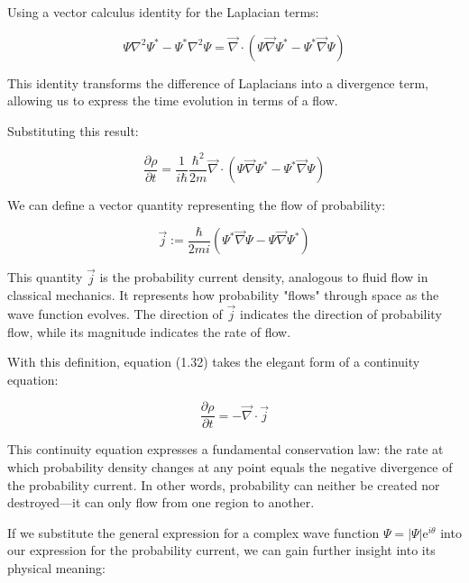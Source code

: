\documentclass[10pt]{article}
\begin{document}
Using a vector calculus identity for the Laplacian terms:

\begin{equation*}
\Psi \nabla^{2} \Psi^{*}-\Psi^{*} \nabla^{2} \Psi=\vec{\nabla} \cdot\left(\Psi \vec{\nabla} \Psi^{*}-\Psi^{*} \vec{\nabla} \Psi\right) \tag{1.31}
\end{equation*}

This identity transforms the difference of Laplacians into a divergence term, allowing us to express the time evolution in terms of a flow.

Substituting this result:

\begin{equation*}
\frac{\partial \rho}{\partial t}=\frac{1}{i\hbar}\frac{\hbar^{2}}{2 m} \vec{\nabla} \cdot\left(\Psi \vec{\nabla} \Psi^{*}-\Psi^{*} \vec{\nabla} \Psi\right) \tag{1.32}
\end{equation*}

We can define a vector quantity representing the flow of probability:

\begin{equation*}
\vec{j}:=\frac{\hbar}{2 m i}\left(\Psi^{*} \vec{\nabla} \Psi-\Psi \vec{\nabla} \Psi^{*}\right) \tag{1.33}
\end{equation*}

This quantity $\vec{j}$ is the probability current density, analogous to fluid flow in classical mechanics. It represents how probability "flows" through space as the wave function evolves. The direction of $\vec{j}$ indicates the direction of probability flow, while its magnitude indicates the rate of flow.

With this definition, equation (1.32) takes the elegant form of a continuity equation:

\begin{equation*}
\frac{\partial \rho}{\partial t}=-\vec{\nabla} \cdot \vec{j} \tag{1.34}
\end{equation*}

This continuity equation expresses a fundamental conservation law: the rate at which probability density changes at any point equals the negative divergence of the probability current. In other words, probability can neither be created nor destroyed—it can only flow from one region to another.


If we substitute the general expression for a complex wave function $\Psi=|\Psi| \mathrm{e}^{i \theta}$ into our expression for the probability current, we can gain further insight into its physical meaning:
\end{document}

